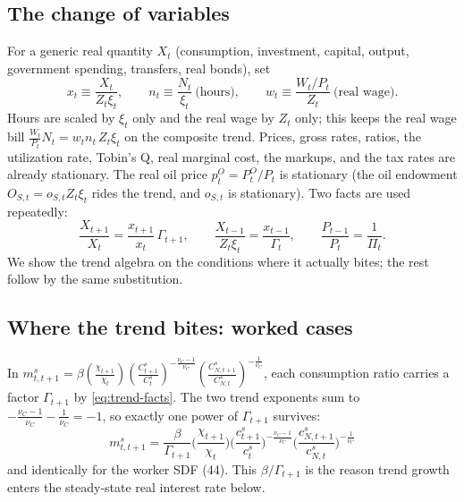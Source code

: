 \subsection{The change of variables}
For a generic real quantity $X_t$ (consumption, investment, capital, output, government spending,
transfers, real bonds), set
\begin{equation}\label{eq:detrend-rule}
x_t\equiv\frac{X_t}{Z_t\xi_t},\qquad
n_t\equiv\frac{N_t}{\xi_t}\ \text{(hours)},\qquad
w_t\equiv\frac{W_t/P_t}{Z_t}\ \text{(real wage)} .
\end{equation}
Hours are scaled by $\xi_t$ only and the real wage by $Z_t$ only; this keeps the real wage bill
$\tfrac{W_t}{P_t}N_t=w_tn_t\,Z_t\xi_t$ on the composite trend. Prices, gross rates, ratios, the
utilization rate, Tobin's Q, real marginal cost, the markups, and the tax rates are already stationary.
The real oil price $p^O_t=P^O_t/P_t$ is stationary (the oil endowment $O_{S,t}=o_{S,t}Z_t\xi_t$ rides
the trend, and $o_{S,t}$ is stationary). Two facts are used repeatedly:
\begin{equation}\label{eq:trend-facts}
\frac{X_{t+1}}{X_t}=\frac{x_{t+1}}{x_t}\,\Gamma_{t+1},
\qquad
\frac{X_{t-1}}{Z_t\xi_t}=\frac{x_{t-1}}{\Gamma_t},
\qquad
\frac{P_{t-1}}{P_t}=\frac1{\Pi_t}.
\end{equation}
We show the trend algebra on the conditions where it actually bites; the rest follow by the same
substitution.

\subsection{Where the trend bites: worked cases}

In $m^s_{t,t+1}=\beta(\tfrac{\chi_{t+1}}{\chi_t})(\tfrac{C^s_{t+1}}{C^s_t})^{-\frac{\nu_C-1}{\nu_C}}
(\tfrac{C^s_{N,t+1}}{C^s_{N,t}})^{-\frac1{\nu_C}}$, each consumption ratio carries a factor
$\Gamma_{t+1}$ by \eqref{eq:trend-facts}. The two trend exponents sum to
$-\tfrac{\nu_C-1}{\nu_C}-\tfrac1{\nu_C}=-1$, so exactly one power of $\Gamma_{t+1}$ survives:
\begin{equation}\label{eq:49d}
\boxed{\,m^s_{t,t+1}=\frac{\beta}{\Gamma_{t+1}}\Big(\frac{\chi_{t+1}}{\chi_t}\Big)
\Big(\frac{c^s_{t+1}}{c^s_t}\Big)^{-\frac{\nu_C-1}{\nu_C}}\Big(\frac{c^s_{N,t+1}}{c^s_{N,t}}\Big)^{-\frac1{\nu_C}}\,}\tag{P-49}
\end{equation}
and identically for the worker SDF (44). This $\beta/\Gamma_{t+1}$ is the reason trend growth enters
the steady-state real interest rate below.


